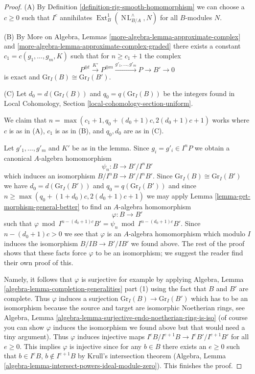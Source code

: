 \documentclass{stacks-project}
\theoremstyle{plain}
\theoremstyle{definition}
\theoremstyle{remark}
\numberwithin{equation}{subsection}
\def\Ext{\mathop{\mathrm{Ext}}\nolimits}
\def\NL{\mathop{N\!L}\nolimits}
\begin{document}
\begin{proof}
(A) By Definition \ref{definition-rig-smooth-homomorphism}
we can choose a $c \geq 0$ such that $I^c$ annihilates
$\Ext^1_B(\NL_{B/A}^\wedge, N)$ for all $B$-modules $N$.

\medskip\noindent
(B) By More on Algebra, Lemmas \ref{more-algebra-lemma-approximate-complex} and
\ref{more-algebra-lemma-approximate-complex-graded}
there exists a constant $c_1 = c(g_1, \ldots, g_m, K)$
such that for $n \geq c_1 + 1$ the complex
$$
P^{\oplus t} \xrightarrow{K'} P^{\oplus m}
\xrightarrow{g'_1, \ldots, g'_m} P \to B' \to 0
$$
is exact and $\text{Gr}_I(B) \cong \text{Gr}_I(B')$.

\medskip\noindent
(C) Let $d_0 = d(\text{Gr}_I(B))$ and $q_0 = q(\text{Gr}_I(B))$
be the integers found in
Local Cohomology, Section \ref{local-cohomology-section-uniform}.

\medskip\noindent
We claim that $n = \max(c_1 + 1, q_0 + (d_0 + 1)c, 2(d_0 + 1)c + 1)$
works where $c$ is as in (A), $c_1$ is as in (B), and $q_0, d_0$ are as
in (C).

\medskip\noindent
Let $g'_1, \ldots, g'_m$ and $K'$ be as in the lemma.
Since $g_i = g'_i \in I^nP$ we obtain a canonical
$A$-algebra homomorphism
$$
\psi_n : B \longrightarrow B'/I^nB'
$$
which induces an isomorphism $B/I^nB \to B'/I^nB'$. Since
$\text{Gr}_I(B) \cong \text{Gr}_I(B')$ we have
$d_0 = d(\text{Gr}_I(B'))$ and $q_0 = q(\text{Gr}_I(B'))$
and since $n \geq \max(q_0 + (1 + d_0)c, 2(d_0 + 1)c + 1)$
we may apply Lemma \ref{lemma-get-morphism-general-better}
to find an $A$-algebra homomorphism
$$
\varphi : B \longrightarrow B'
$$
such that
$\varphi \bmod I^{n - (d_0 + 1)c}B' = \psi_n \bmod I^{n - (d_0 + 1)c}B'$.
Since $n - (d_0 + 1)c > 0$ we see that $\varphi$ is an $A$-algebra
homomorphism which modulo $I$ induces the isomorphism $B/IB \to B'/IB'$
we found above.
The rest of the proof shows that these facts force $\varphi$
to be an isomorphism; we suggest the reader find their own proof of this.

\medskip\noindent
Namely, it follows that $\varphi$ is surjective for example by applying
Algebra, Lemma \ref{algebra-lemma-completion-generalities} part (1)
using the fact that $B$ and $B'$ are complete.
Thus $\varphi$ induces a surjection $\text{Gr}_I(B) \to \text{Gr}_I(B')$
which has to be an isomorphism because the source and target are
isomorphic Noetherian rings, see
Algebra, Lemma \ref{algebra-lemma-surjective-endo-noetherian-ring-is-iso}
(of course you can show $\varphi$ induces the isomorphism we found above
but that would need a tiny argument).
Thus $\varphi$ induces injective maps
$I^eB/I^{e + 1}B \to I^eB'/I^{e + 1}B'$ for all $e \geq 0$.
This implies $\varphi$ is injective since for any $b \in B$ there
exists an $e \geq 0$ such that $b \in I^eB$, $b \not \in I^{e + 1}B$
by Krull's intersection theorem (Algebra, Lemma
\ref{algebra-lemma-intersect-powers-ideal-module-zero}).
This finishes the proof.
\end{proof}
\end{document}
